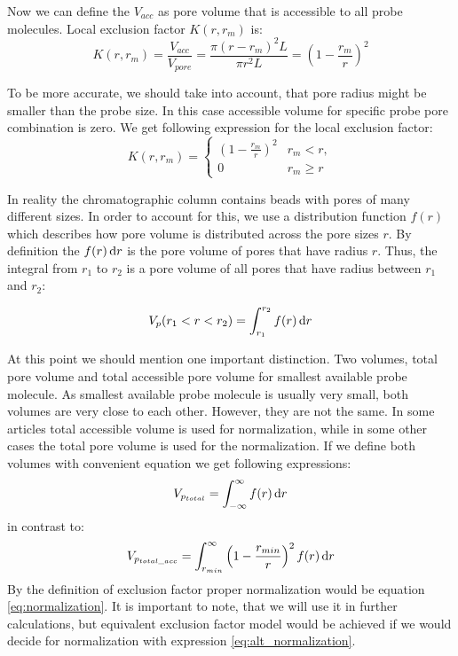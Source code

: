 Now we can define the $V_{acc}$ as pore volume that is accessible to all probe
molecules. Local exclusion factor $K(r, r_m)$ is:
\begin{equation}
    K(r, r_m) = \frac{V_{acc}}{V_{pore}} = \frac{\pi (r-r_m)^2 L}{\pi r^2 L} = \left(1 -
    \frac{r_m}{r}\right)^2
\end{equation}

To be more accurate, we should take into account, that pore radius might be smaller
than the probe size. In this case accessible volume for specific probe pore
combination is zero. We get following expression for the local exclusion
factor:
\begin{equation}\label{eq:local_ex_coeff}
	K(r, r_m) = 
	\begin{cases}
        \left(1 - \frac{r_m}{r}\right)^2 & r_m < r,  \\
		0           & r_m \geq r
	\end{cases}
\end{equation}


In reality the chromatographic column contains beads with pores of many
different sizes. In order to account for this, we use a distribution function
$f(r)$ which describes how pore volume is distributed across the pore sizes $r$.
By definition the $f(r)\,\mathrm{d} r$ is the pore volume of pores that have radius $r$.
Thus, the integral from $r_1$ to $r_2$ is a pore volume of all pores that have
radius between $r_1$ and $r_2$:

\begin{equation}
    V_p(r_1 < r < r_2) = \int_{r_1}^{r_2}f(r)\,\mathrm{d} r
\end{equation}

At this point we should mention one important distinction. Two volumes, total
pore volume and total accessible pore volume for smallest available probe
molecule. As smallest available probe molecule is usually very small, both 
volumes are very close to each other.
However, they are not the same. In some articles total accessible volume is used
for normalization, while in some other cases the total pore volume is used for
the normalization. If we define both volumes with convenient equation we get
following expressions:
\begin{equation}\label{eq:normalization}
    V_{p_{total}} = \int_{-\infty}^{\infty}f(r)\,\mathrm{d} r
\end{equation}
in contrast to:
\begin{equation}\label{eq:alt_normalization}
    V_{p_{total\_acc}} =
    \int_{r_{min}}^{\infty}\left(1-\frac{r_{min}}{r}\right)^2f(r)\,\mathrm{d} r
\end{equation}
By the definition of exclusion factor proper normalization would be equation
\ref{eq:normalization}. It is important to note, that we will use it in further
calculations, but equivalent exclusion factor model would be achieved if we
would decide for normalization with expression \ref{eq:alt_normalization}.

